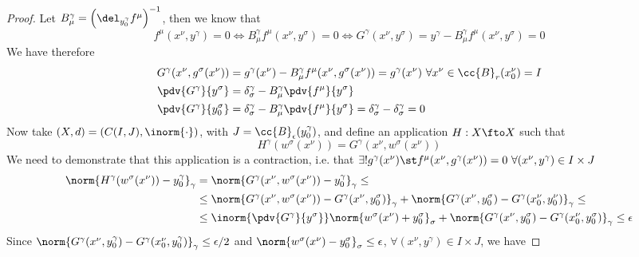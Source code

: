 \documentclass[../mmf.tex]{subfiles}
\begin{document}
\begin{proof}
	Let $B^\gamma_\mu=\left(\del_{y_0^\gamma}f^\mu\right)^{-1}$, then we know that
	\begin{equation*}
		f^\mu(x^\nu,y^\gamma)=0\iff B^\gamma_\mu f^\mu(x^\nu,y^\sigma)=0\iff G^\gamma(x^\nu,y^\sigma)=y^\gamma-B^\gamma_\mu f^\mu(x^\nu,y^\sigma)=0
	\end{equation*}
	We have therefore
	\begin{equation*}
		\begin{aligned}
			G^\gamma(x^\nu,g^\sigma(x^\nu))&=g^\gamma(x^\nu)-B^\gamma_\mu f^\mu(x^\nu,g^\sigma(x^\nu))=g^\gamma(x^\nu)\ \forall x^\nu\in\cc{B}_r(x^\nu_0)=I\\
			\pdv{G^\gamma}{y^\sigma}&=\delta^\gamma_\sigma-B^\gamma_\mu\pdv{f^\mu}{y^\sigma}\\
			\pdv{G^\gamma}{y^\sigma_0}&=\delta^\gamma_\sigma-B^\gamma_\mu\pdv{f^\mu}{y^\sigma}=\delta^\gamma_\sigma-\delta^\gamma_\sigma=0\\
		\end{aligned}
	\end{equation*}
	Now take $(X,d)=(C(I,J),\inorm{\cdot})$, with $J=\cc{B}_\epsilon(y^\gamma_0)$, and define an application $H:X\fto X$ such that
	\begin{equation*}
		H^\gamma(w^\sigma(x^\nu))=G^\gamma(x^\nu,w^\sigma(x^\nu))
	\end{equation*}
	We need to demonstrate that this application is a contraction, i.e. that $\exists!g^\gamma(x^\nu)\st f^\mu(x^\nu,g^\gamma(x^\nu))=0\ \forall(x^\nu,y^\gamma)\in I\times J$\\
	\begin{equation*} %
		\begin{aligned}
			\norm{H^\gamma(w^\sigma(x^\nu))-y^\gamma_0}_\gamma&=\norm{G^\gamma(x^\nu,w^\sigma(x^\nu))-y_0^\gamma}_\gamma\le\\
			&\le\norm{G^\gamma(x^\nu,w^\sigma(x^\nu))-G^\gamma(x^\nu,y^\sigma_0)}_\gamma+\norm{G^\gamma(x^\nu,y_0^\sigma)-G^\gamma(x_0^\nu,y_0^\nu)}_\gamma\le\\
			&\le\inorm{\pdv{G^\gamma}{y^\sigma}}\norm{w^\sigma(x^\nu)+y^\sigma_0}_\sigma+\norm{G^\gamma(x^\nu,y^\sigma_0)-G^\gamma(x^\nu_0,y^\sigma_0)}_\gamma\le\epsilon
		\end{aligned}
	\end{equation*} %
	Since $\norm{G^\gamma(x^\nu,y^\gamma_0)-G^\gamma(x^\nu_0,y^\gamma_0)}_\gamma\le\epsilon/2$ and $\norm{w^\sigma(x^\nu)-y^\sigma_0}_\sigma\le\epsilon$, $\forall(x^\nu,y^\gamma)\in I\times J$, we have %

\end{proof}
\end{document}
